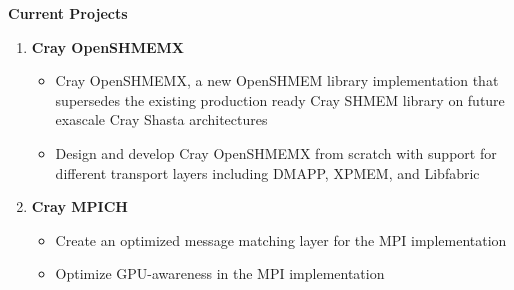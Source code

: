\textbf{Current Projects}
\begin{enumerate}
\setcounter{enumi}{0}
\item \textbf{Cray OpenSHMEMX}
    \begin{itemize}
        \item Cray OpenSHMEMX, a new OpenSHMEM library implementation that
        supersedes the existing production ready Cray SHMEM library on future
        exascale Cray Shasta architectures
        \item Design and develop Cray OpenSHMEMX from scratch with support for
        different transport layers including DMAPP, XPMEM, and Libfabric
    \end{itemize}

\item \textbf{Cray MPICH}
    \begin{itemize}
        \item Create an optimized message matching layer for the MPI
        implementation
        \item Optimize GPU-awareness in the MPI implementation
    \end{itemize}
\end{enumerate}

